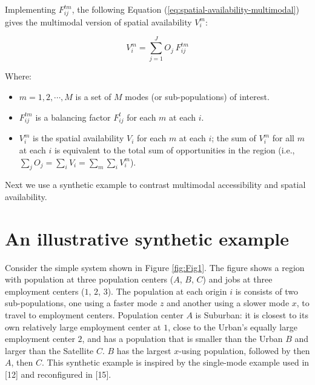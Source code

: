 \documentclass[10pt,letterpaper]{article}
\providecommand{\tightlist}{%
  \setlength{\itemsep}{0pt}\setlength{\parskip}{0pt}}
\begin{document}
Implementing \(F^{tm}_{ij}\), the following Equation
(\ref{eq:spatial-availability-multimodal}) gives the multimodal version
of spatial availability \(V_i^m\):

\begin{equation}
\label{eq:spatial-availability-multimodal}
V^m_{i} = \sum_{j=1}^J O_j\ F^{tm}_{ij}
\end{equation}

\noindent Where:

\begin{itemize}
\tightlist
\item
  \(m = 1, 2,\cdots, M\) is a set of \(M\) modes (or sub-populations) of
  interest.
\item
  \(F^{tm}_{ij}\) is a balancing factor \(F^t_{ij}\) for each \(m\) at
  each \(i\).
\item
  \(V^m_{i}\) is the spatial availability \(V_{i}\) for each \(m\) at
  each \(i\); the sum of \(V^m_{i}\) for all \(m\) at each \(i\) is
  equivalent to the total sum of opportunities in the region (i.e.,
  \(\sum_j O_j = \sum_i V_i = \sum_{m} \sum_{i} V^m_{i}\)).
\end{itemize}

Next we use a synthetic example to contrast multimodal accessibility and
spatial availability.

\hypertarget{an-illustrative-synthetic-example}{%
\section{An illustrative synthetic
example}\label{an-illustrative-synthetic-example}}

Consider the simple system shown in Figure \ref{fig:Fig1}. The figure
shows a region with population at three population centers (\(A\),
\(B\), \(C\)) and jobs at three employment centers (\(1\), \(2\),
\(3\)). The population at each origin \(i\) is consists of two
sub-populations, one using a faster mode \(z\) and another using a
slower mode \(x\), to travel to employment centers. Population center
\(A\) is Suburban: it is closest to its own relatively large employment
center at \(1\), close to the Urban's equally large employment center
\(2\), and has a population that is smaller than the Urban \(B\) and
larger than the Satellite \(C\). \(B\) has the largest \(x\)-using
population, followed by then \(A\), then \(C\). This synthetic example
is inspired by the single-mode example used in {[}12{]} and reconfigured
in {[}15{]}.
\end{document}

